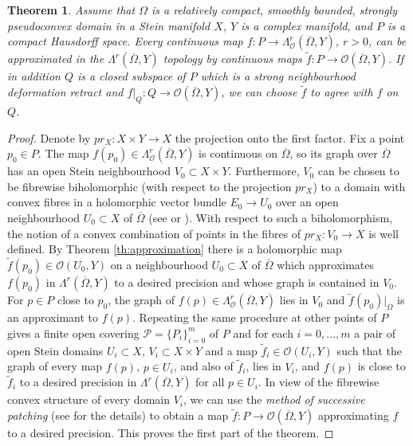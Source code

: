 \documentclass[11pt]{amsart}
\numberwithin{equation}{section}
\newtheorem{theorem}{Theorem}[section]
\theoremstyle{definition}
\newcommand\Pcal{\mathcal{P}}
\newcommand\Oscr{\mathscr{O}}
\begin{document}
%
%
\begin{theorem}\label{th:approximation-par}
Assume that $\Omega$ is a relatively compact, smoothly bounded, strongly 
pseudoconvex domain in a Stein manifold $X$, $Y$ is a complex manifold,
and $P$ is a compact Hausdorff space. Every continuous map 
$f:P\to \Lambda^r_\Oscr(\overline \Omega,Y)$, $r>0$, 
can be approximated in the $\Lambda^r(\overline \Omega,Y)$ topology
by continuous maps $\tilde f: P \to \Oscr(\overline \Omega,Y)$.
If in addition $Q$ is a closed subspace of $P$ which is a 
strong neighbourhood deformation retract and 
$f|_{Q}:Q \to \Oscr(\overline \Omega,Y)$, 
we can choose $\tilde f$ to agree with $f$ on $Q$.
\end{theorem}

\begin{proof}
Denote by $pr_X:X\times Y\to X$ the projection onto the first factor. 
Fix a point $p_0\in P$. 
The map $f(p_0)\in \Lambda^r_\Oscr(\overline \Omega,Y)$
is continuous on $\overline \Omega$, so its graph over $\overline \Omega$
has an open Stein neighbourhood $V_0 \subset X\times Y$. 
Furthermore, $V_0$ can be chosen to be fibrewise biholomorphic 
(with respect to the projection $pr_X$) 
to a domain with convex fibres in a holomorphic vector bundle
$E_0 \to U_0$ over an open neighbourhood $U_0\subset X$ of 
$\overline \Omega$ (see \cite[Theorem 1.2]{Forstneric2007AJM} or
\cite[Theorem 8.11.1]{Forstneric2017E}).  
With respect to such a biholomorphism, the notion of a convex combination
of points in the fibres of $pr_X:V_0\to X$ is well defined. 
By Theorem \ref{th:approximation} there is  
a holomorphic map $\tilde f(p_0) \in \Oscr(U_0,Y)$  
on a neighbourhood $U_0\subset X$ of $\overline \Omega$ which 
approximates $f(p_0)$ in $\Lambda^r(\overline \Omega,Y)$ 
to a desired precision and whose graph is contained in $V_0$. 
For $p\in P$ close to $p_0$, the graph of 
$f(p)\in \Lambda^r_\Oscr(\overline \Omega,Y)$ lies 
in $V_0$ and $\tilde f(p_0)|_{\overline\Omega}$ is an approximant to $f(p)$. 
Repeating the same procedure at other points of $P$ gives a finite open 
covering $\Pcal=\{P_i\}_{i=0}^m$ of $P$ and for each $i=0,\ldots,m$ 
a pair of open Stein domains $U_i\subset X$, $V_i\subset X\times Y$ and 
a map $\tilde f_i\in \Oscr(U_i,Y)$ such that the graph of every map
$f(p)$, $p\in U_i$, and also of $\tilde f_i$, 
lies in $V_i$, and $f(p)$ is close to $\tilde f_i$ to a desired 
precision in $\Lambda^r(\overline \Omega,Y)$ for all $p\in U_i$. 
In view of the fibrewise convex structure of every domain $V_i$,
we can use the {\em method of successive patching} 
(see \cite[p.\ 78, p.\ 282]{Forstneric2017E} for the details) 
to obtain a map $\tilde f:P\to \Oscr(\overline \Omega,Y)$ 
approximating $f$ to a desired precision. This proves 
the first part of the theorem.


\end{proof}
\end{document}
